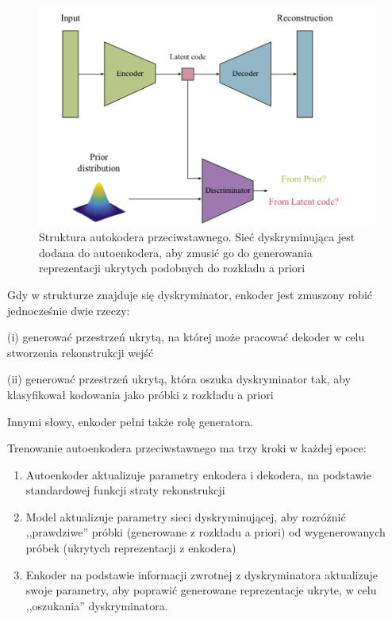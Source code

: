 \documentclass[12pt]{mwbk}
\theoremstyle{plain}
\theoremstyle{definition}
\theoremstyle{remark}
\newcommand\zrodlo[1]{\par\vspace{-3mm}{\small\textit{Źródło: }#1 }}
\begin{document}
\begin{figure}[!h]
	\centering
	\includegraphics[width=\linewidth]{rys/adversial_ae_structure.png}
	\caption{Struktura autokodera przeciwstawnego. Sieć dyskryminująca jest dodana do autoenkodera, aby zmusić go do generowania reprezentacji ukrytych podobnych do rozkładu a priori}
	\zrodlo{\cite{pinaya}}
	\label{fig:adversial-ae-structure}
\end{figure}

\noindent Gdy w strukturze znajduje się dyskryminator, enkoder jest zmuszony robić jednocześnie dwie rzeczy:

\noindent (i) generować przestrzeń ukrytą, na której może pracować dekoder w celu stworzenia rekonstrukcji wejść

\noindent (ii) generować przestrzeń ukrytą, która oszuka dyskryminator tak, aby klasyfikował kodowania jako próbki z rozkładu a priori

\noindent Innymi słowy, enkoder pełni także rolę generatora.

Trenowanie autoenkodera przeciwstawnego ma trzy kroki w każdej epoce:
 
 \begin{enumerate}

\item Autoenkoder aktualizuje parametry enkodera i dekodera, na podstawie standardowej funkcji straty rekonstrukcji

\item Model aktualizuje parametry sieci dyskryminującej, aby rozróżnić ,,prawdziwe'' próbki (generowane z rozkładu a priori) od wygenerowanych próbek (ukrytych reprezentacji z enkodera)

\item Enkoder na podstawie informacji zwrotnej z dyskryminatora aktualizuje swoje parametry, aby poprawić generowane reprezentacje ukryte, w celu ,,oszukania'' dyskryminatora.

\end{enumerate}
\end{document}
